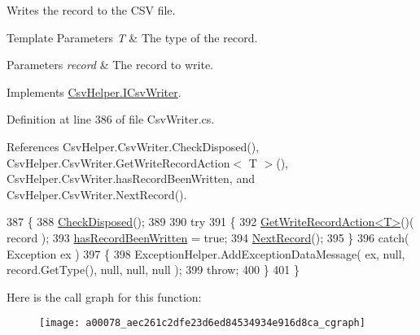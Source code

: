 Writes the record to the C\-S\-V file. 


\begin{DoxyTemplParams}{Template Parameters}
{\em T} & The type of the record.\\
\hline
\end{DoxyTemplParams}

\begin{DoxyParams}{Parameters}
{\em record} & The record to write.\\
\hline
\end{DoxyParams}


Implements \hyperlink{a00112_a9620a114ee9e858760f74013cf341f3a}{Csv\-Helper.\-I\-Csv\-Writer}.



Definition at line 386 of file Csv\-Writer.\-cs.



References Csv\-Helper.\-Csv\-Writer.\-Check\-Disposed(), Csv\-Helper.\-Csv\-Writer.\-Get\-Write\-Record\-Action$<$ T $>$(), Csv\-Helper.\-Csv\-Writer.\-has\-Record\-Been\-Written, and Csv\-Helper.\-Csv\-Writer.\-Next\-Record().


\begin{DoxyCode}
387         \{
388             \hyperlink{a00078_a15e26ec8c5c935030677bee9a36d7c16}{CheckDisposed}();
389 
390             \textcolor{keywordflow}{try}
391             \{
392                 \hyperlink{a00078_a147c7b5888823fdf81fb021db706181c}{GetWriteRecordAction<T>}()( record );
393                 \hyperlink{a00078_a0c31cd2b7d4eea93db887a46c33344fb}{hasRecordBeenWritten} = \textcolor{keyword}{true};
394                 \hyperlink{a00078_a397af8c87002d3b9c2b5152c6981d4d2}{NextRecord}();
395             \}
396             \textcolor{keywordflow}{catch}( Exception ex )
397             \{
398                 ExceptionHelper.AddExceptionDataMessage( ex, null, record.GetType(), null, null, null );
399                 \textcolor{keywordflow}{throw};
400             \}
401         \}
\end{DoxyCode}


Here is the call graph for this function\-:
\nopagebreak
\begin{figure}[H]
\begin{center}
\leavevmode
\texttt{[image: a00078\_aec261c2dfe23d6ed84534934e916d8ca\_cgraph]}
\end{center}
\end{figure}


